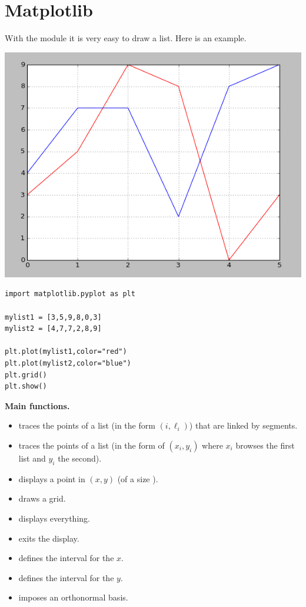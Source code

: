 \documentclass[11pt,class=report,crop=false]{standalone}
\begin{document}
\section{Matplotlib}

With the  module it is very easy to draw a list. Here is an example.

\begin{center}
\includegraphics[scale=\myscale,scale=0.5]{../lists/screen-lists-lesson-visualization}
\end{center}

\begin{lstlisting}
import matplotlib.pyplot as plt

mylist1 = [3,5,9,8,0,3]
mylist2 = [4,7,7,2,8,9]

plt.plot(mylist1,color="red")
plt.plot(mylist2,color="blue")
plt.grid()
plt.show()
\end{lstlisting}


\textbf{Main functions.}

\begin{itemize}
  \item {} traces the points of a list (in the form $(i,\ell_i)$)  that are linked by segments. 
  \item {} traces the points of a list (in the form of $(x_i,y_i)$ where $x_i$ browses the first list and $y_i$ the second).    
  \item {} displays a point in $(x,y)$ (of a size ).
  \item {} draws a grid.  
  \item {} displays everything. 
  \item {} exits the display.
  
  \item {} defines the interval for the $x$.
  \item {} defines the interval for the $y$.
  \item {} imposes an orthonormal basis.  
\end{itemize}
\end{document}
